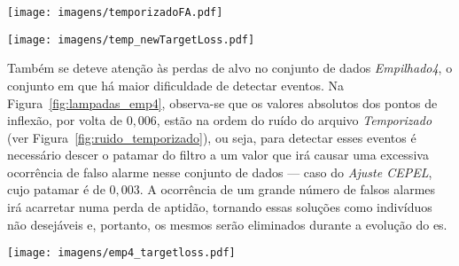 \begin{sidewaysfigure}[p]
\centering
\texttt{[image: imagens/temporizadoFA.pdf]}
\caption[Exemplos de falsos alarmes no conjunto de dados
\emph{Temporizado Gabarito 1}.]
{Exemplos de falsos alarmes no conjunto de dados \emph{Temporizado
Gabarito 1}. Os falsos alarmes são as caixas verdes e vermelhas
exibidas. Na subfigura inferior, são mostrados alguns pontos de
inflexão e seus valores em unidades da resposta do filtro, bem como
valores da resposta do filtro para ruídos.}
\label{fig:ruido_temporizado}
\end{sidewaysfigure}

\begin{sidewaysfigure}[p]
\centering
\texttt{[image: imagens/temp\_newTargetLoss.pdf]}
\caption{Exemplos de perdas de alvos do distúrbio no conjunto de dados
\emph{Temporizado Gabarito 2}.}
\label{fig:temporizado_newTargetLoss}
\end{sidewaysfigure}

Também se deteve atenção às perdas de alvo no conjunto de dados
\emph{Empilhado4}, o conjunto em que há maior dificuldade de
detectar eventos. Na Figura~\ref{fig:lampadas_emp4}, 
observa-se que os valores absolutos dos pontos de inflexão,
por volta de $0,006$, estão na ordem do ruído do arquivo
\emph{Temporizado} (ver Figura~\ref{fig:ruido_temporizado}), ou seja,
para detectar esses eventos é necessário descer o patamar do filtro a
um valor que irá causar uma excessiva ocorrência de falso alarme
nesse conjunto de dados --- caso do \emph{Ajuste CEPEL}, cujo patamar
é de $0,003$. A ocorrência de um grande número de falsos alarmes irá
acarretar numa perda de aptidão, tornando essas soluções
como indivíduos não desejáveis e, portanto, os mesmos serão eliminados
durante a evolução do \acs{es}.

\begin{sidewaysfigure}[p]
\centering
\texttt{[image: imagens/emp4\_targetloss.pdf]}
\caption[Exemplos de perdas de alvo no conjunto de dados
\emph{Empilhado4} para a configuração \emph{ES 2}] {Exemplos de perdas
de alvo no conjunto de dados \emph{Empilhado4} para a configuração
\emph{ES 2}. Os eventos não detectados tem seus pontos de inflexão e
seus valores em unidades da resposta do filtro exibidos. As etiquetas
em preto indicam os valores de suas características, aonde é possível
observar que o evento de maior potencia exibido que constitui perda de
alvo apresenta um degrau em valor absoluto de cerca de 24 W.}
\label{fig:lampadas_emp4}
\end{sidewaysfigure}

